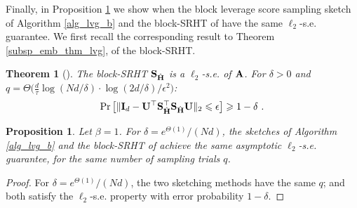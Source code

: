 \documentclass[journal,letterpaper,onecolumn,twoside,nofonttune]{IEEEtran}
\newcommand{\I}{\mathcal{I}}
\newcommand{\Ub}{\bold{U}}
\newcommand{\Ab}{\bold{A}}
\newcommand{\Ib}{\bold{I}}
\newcommand{\Hbh}{\hat{\bold{H}}}
\newcommand{\Sb}{\bold{S}}
\newcommand{\Omb}{\bold{\Omega}}
\newcommand{\Ombwt}{\widetilde{\Omb}}
\newtheorem{Thm}{Theorem}
\newtheorem{Prop}{Proposition}
\begin{document}

Finally, in Proposition \ref{comparison_two_embds} we show when the block leverage score sampling sketch of Algorithm \ref{alg_lvg_b} and the block-SRHT of \cite{CMPH22} have the same $\ell_2$-s.e. guarantee. We first recall the corresponding result to Theorem \ref{subsp_emb_thm_lvg}, of the block-SRHT.

\begin{Thm}[{\cite[Theorem 7]{CMPH22}}]
\label{subsp_emb_thm_SRHT}
The block-SRHT $\Sb_{\Hbh}$ is a $\ell_2$-s.e. of $\Ab$. For $\delta>0$ and $q=\Theta\big(\frac{d}{\tau}\log(Nd/\delta)\cdot\log(2d/\delta)/\epsilon^2\big)$:
$$ \Pr\left[\|\Ib_d-\Ub^\top\Sb_{\Hbh}^\top\Sb_{\Hbh} \Ub\|_2\leqslant\epsilon\right]\geqslant 1-\delta \ . $$
\end{Thm}

\begin{Prop}
\label{comparison_two_embds}
Let $\beta=1$. For $\delta=e^{\Theta(1)}/(Nd)$, the sketches of Algorithm \ref{alg_lvg_b} and the block-SRHT of \cite{CMPH22} achieve the same asymptotic $\ell_2$-s.e. guarantee, for the same number of sampling trials $q$.
\end{Prop}

\begin{proof}
For $\delta=e^{\Theta(1)}/(Nd)$, the two sketching methods have the same $q$; and both satisfy the $\ell_2$-s.e. property with error probability $1-\delta$.%
\end{proof}
\end{document}
